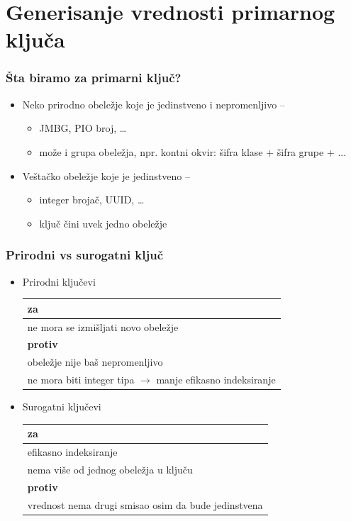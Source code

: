 \documentclass[compress]{beamer}
\begin{document}
\section[Ključevi]{Generisanje vrednosti primarnog ključa}
\begin{frame}
  \frametitle{Šta biramo za primarni ključ?}
  \begin{itemize}
    \item Neko prirodno obeležje koje je jedinstveno i nepromenljivo -- 
    \begin{itemize}
      \item JMBG, PIO broj, \ldots
      \item može i grupa obeležja, npr. kontni okvir: šifra klase + šifra grupe + ...
    \end{itemize}
    \item Veštačko obeležje koje je jedinstveno -- 
    \begin{itemize}
      \item integer brojač, UUID, \ldots
      \item ključ čini uvek jedno obeležje
    \end{itemize}
  \end{itemize}
\end{frame}
\begin{frame}
  \frametitle{Prirodni vs surogatni ključ}
  \begin{itemize}
    \item Prirodni ključevi
    \small{\begin{tabular}{l}
      \textbf{za} \\ \hline
      ne mora se izmišljati novo obeležje \\ %
      \textbf{protiv} \\ \hline
      obeležje nije baš nepromenljivo \\
      ne mora biti integer tipa  $\rightarrow$ manje efikasno indeksiranje 
    \end{tabular}}
    \item Surogatni ključevi
    \small{\begin{tabular}{l}
      \textbf{za} \\ \hline
      efikasno indeksiranje \\ 
      nema više od jednog obeležja u ključu \\ %
      \textbf{protiv} \\ \hline
      vrednost nema drugi smisao osim da bude jedinstvena
    \end{tabular}}
  \end{itemize}
\end{frame}
\end{document}
